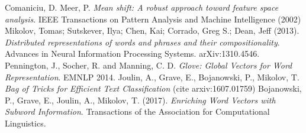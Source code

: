 \documentclass[oneside, twocolumn, a4paper, 10pt]{IEEEtran}
\begin{document}
\begin{thebibliography}{6}
 Comaniciu, D. Meer, P. \textit{Mean shift: A robust approach toward feature space analysis}. IEEE Transactions on Pattern Analysis and Machine Intelligence (2002)
 Mikolov, Tomas; Sutskever, Ilya; Chen, Kai; Corrado, Greg S.; Dean, Jeff (2013). \textit{Distributed representations of words and phrases and their compositionality}. Advances in Neural Information Processing Systems. arXiv:1310.4546.
 Pennington, J., Socher, R. and Manning, C. D. \textit{Glove: Global Vectors for Word Representation}. EMNLP 2014.
 Joulin, A., Grave, E., Bojanowski, P., Mikolov, T. \textit{Bag of Tricks for Efficient Text Classification} (cite arxiv:1607.01759)
 Bojanowski, P., Grave, E., Joulin, A.,  Mikolov, T. (2017). \textit{Enriching Word Vectors with Subword Information}. Transactions of the Association for Computational Linguistics.
\end{thebibliography}
\end{document}
